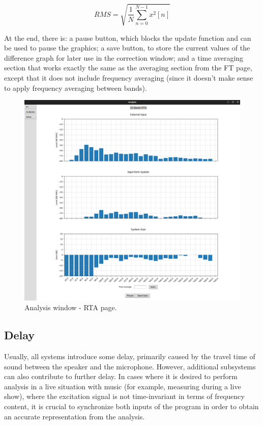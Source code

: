 \begin{equation}
	\label{eq:RMS}
	RMS = \sqrt{ \frac{1}{N} \sum_{n=0}^{N-1} x^2[n] }
\end{equation}

At the end, there is: a pause button, which blocks the update function and can be used to pause the graphics; a save button, to store the current values of the difference graph for later use in the correction window; and a time averaging section that works exactly the same as the averaging section from the FT page, except that it does not include frequency averaging (since it doesn't make sense to apply frequency averaging between bands).

\begin{figure}[H]
	\centering
	\includegraphics[width=1
	\linewidth]{Figures/RTA_page.png}
	\caption{Analysis window - RTA page.}
	\label{fig:RTA_page}
\end{figure}


\subsection{Delay}

Usually, all systems introduce some delay, primarily caused by the travel time of sound between the speaker and the microphone. However, additional subsystems can also contribute to further delay. In cases where it is desired to perform analysis in a live situation with music (for example, measuring during a live show), where the excitation signal is not time-invariant in terms of frequency content, it is crucial to synchronize both inputs of the program in order to obtain an accurate representation from the analysis.

